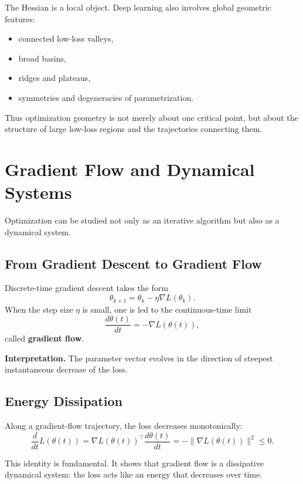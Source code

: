 The Hessian is a local object. Deep learning also involves global geometric features:
\begin{itemize}
    \item connected low-loss valleys,
    \item broad basins,
    \item ridges and plateaus,
    \item symmetries and degeneracies of parametrization.
\end{itemize}

\medskip

\noindent
Thus optimization geometry is not merely about one critical point, but about the structure of large low-loss regions and the trajectories connecting them.

\section{Gradient Flow and Dynamical Systems}

Optimization can be studied not only as an iterative algorithm but also as a dynamical system.

\subsection{From Gradient Descent to Gradient Flow}

Discrete-time gradient descent takes the form
\[
\theta_{k+1}=\theta_k-\eta \nabla L(\theta_k).
\]
When the step size \(\eta\) is small, one is led to the continuous-time limit
\[
\frac{d\theta(t)}{dt} = -\nabla L(\theta(t)),
\]
called \textbf{gradient flow}.

\medskip

\noindent
\textbf{Interpretation.}
The parameter vector evolves in the direction of steepest instantaneous decrease of the loss.

\subsection{Energy Dissipation}

Along a gradient-flow trajectory, the loss decreases monotonically:
\[
\frac{d}{dt}L(\theta(t))
=
\nabla L(\theta(t))^\top \frac{d\theta(t)}{dt}
=
-\|\nabla L(\theta(t))\|^2
\le 0.
\]

\medskip

\noindent
This identity is fundamental. It shows that gradient flow is a dissipative dynamical system: the loss acts like an energy that decreases over time.

